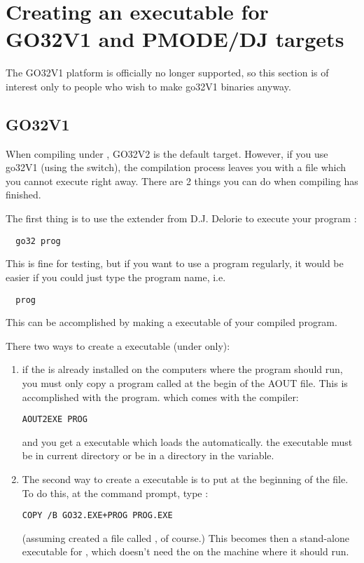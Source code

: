 \documentclass{report}
\begin{document}
\section{Creating an executable for GO32V1 and PMODE/DJ targets}
\label{go32v1}

The GO32V1 platform is officially no longer supported, so this section
is of interest only to people who wish to make go32V1 binaries anyway.

%
%
\subsection{GO32V1}
When compiling under \dos, GO32V2 is the default target. However, if you use
go32V1 (using the  switch), the
compilation process leaves you with a file which you cannot execute right away.
There are 2 things you can do when compiling has finished.

The first thing is to use the \dos extender from D.J. Delorie to execute
your program :
\begin{verbatim}
  go32 prog
\end{verbatim}
This is fine for testing, but if you want to use a program regularly, it
would be easier if you could just type the program name, i.e.
\begin{verbatim}
  prog
\end{verbatim}
This can be accomplished by making a \dos executable of your compiled program.

There two ways to create a \dos executable (under \dos only):
\begin{enumerate}
\item if the  is already
installed on the computers where the program should run, you must
only copy a program called  at the begin of
the AOUT file. This is accomplished with the  program.
which comes with the compiler:
\begin{verbatim}
AOUT2EXE PROG
\end{verbatim}
and you get a \dos executable which loads the  automatically.
the  executable must be in current directory or be
in a directory in the  variable.
\item
The second way to create a \dos executable is to put
 at the beginning of the  file. To do this, at the
command prompt, type :
\begin{verbatim}
COPY /B GO32.EXE+PROG PROG.EXE
\end{verbatim}
(assuming \fpc created a file called , of course.)
This becomes then a stand-alone executable for \dos, which doesn't need the
 on the machine where it should run.
\end{enumerate}
\end{document}
